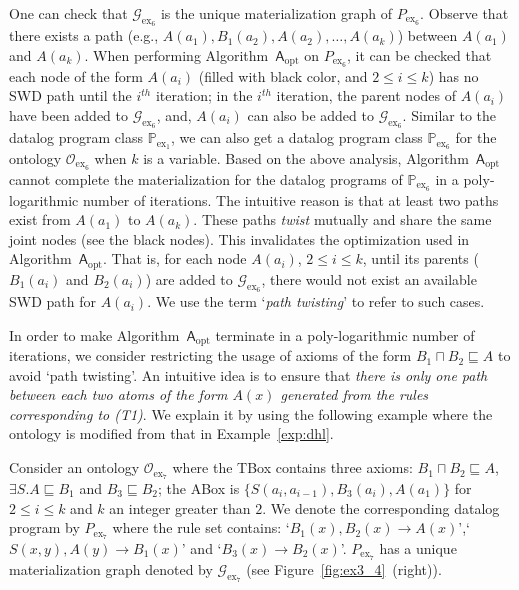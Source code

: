One can check that $\mathcal{G}_{\text{ex}_6}$ is the unique materialization graph of $P_{\text{ex}_6}$.
Observe that there exists a path (e.g., $A(a_1),B_1(a_2),A(a_2),\ldots,A(a_k)$) between $A(a_1)$ and $A(a_k)$.
When performing Algorithm~$\mathsf{A}_{\text{opt}}$ on $P_{\text{ex}_6}$, it can be checked that
each node of the form $A(a_i)$ (filled with black color,
and $2\leq i\leq k$) has no SWD path until the $i^{th}$ iteration;
in the $i^{th}$ iteration, the parent nodes of $A(a_i)$ have been added to $\mathcal{G}_{\text{ex}_6}$,
and, $A(a_i)$ can also be added to $\mathcal{G}_{\text{ex}_6}$.
Similar to the datalog program class $\mathbb{P}_{\text{ex}_1}$, we can also get a
datalog program class $\mathbb{P}_{\text{ex}_6}$ for the ontology $\mathcal{O}_{\text{ex}_6}$
when $k$ is a variable. Based on the above analysis, Algorithm~$\mathsf{A}_{\text{opt}}$ cannot complete the materialization
for the datalog programs of $\mathbb{P}_{\text{ex}_6}$ in a poly-logarithmic
number of iterations.
The intuitive reason is that at least two paths exist
from $A(a_1)$ to $A(a_k)$. These paths \emph{twist} mutually and share the same joint nodes (see the black nodes).
This invalidates the optimization used in Algorithm~$\mathsf{A}_{\text{opt}}$.
That is, for each node $A(a_i)$, $2\leq i\leq k$, until its parents ($B_1(a_i)$ and $B_2(a_i)$) are added
to $\mathcal{G}_{\text{ex}_6}$, there would not exist an available SWD path for $A(a_i)$.
We use the term `\emph{path twisting}' to refer to such cases.

In order to make Algorithm~$\mathsf{A}_{\text{opt}}$ terminate in a poly-logarithmic number of iterations,
we consider restricting the usage of axioms of the form $B_1\sqcap B_2\sqsubseteq A$
to avoid `path twisting'. An intuitive idea is to
ensure that \emph{there is only one path between each two atoms of the form $A(x)$
generated from the rules corresponding to (T1)}.
We explain it by using the following example where the ontology is modified from
that in Example~\ref{exp:dhl}.

\begin{example}\label{exp:simpleC}
Consider an ontology $\mathcal{O}_{\text{ex}_7}$ where the TBox contains three axioms:
$B_1\sqcap B_2\sqsubseteq A$, $\exists S.A\sqsubseteq B_1$ and $B_3\sqsubseteq B_2$;
the ABox is $\{S(a_i,a_{i-1}), B_3(a_i), A(a_1)\}$
for $2\leq i\leq k$ and $k$ an integer greater than $2$.
We denote the corresponding datalog program by $P_{\text{ex}_7}$ where the rule set contains:
`$B_1(x),B_2(x)\rightarrow A(x)$',`$S(x,y),A(y)\rightarrow B_1(x)$' and `$B_3(x)\rightarrow B_2(x)$'.
$P_{\text{ex}_7}$ has a unique materialization graph denoted by $\mathcal{G}_{\text{ex}_7}$ (see Figure~\ref{fig:ex3_4}~(right)).
\end{example}

